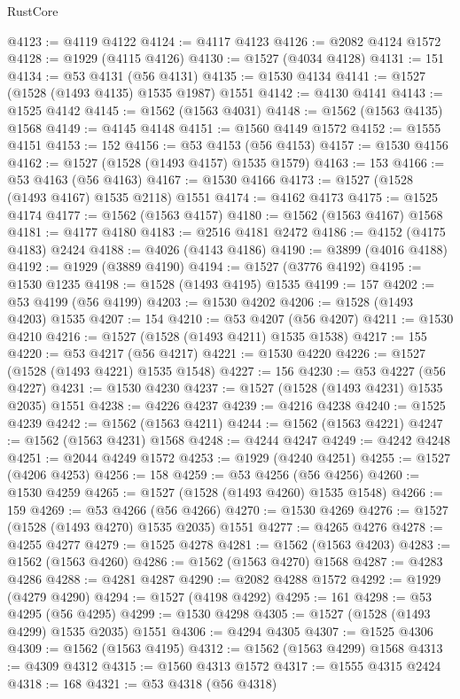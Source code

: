 \begin{lexlean}{RustCore}
\begin{coremodule}
@4123 := @4119 @4122
@4124 := @4117 @4123
@4126 := @2082 @4124 @1572
@4128 := @1929 (@4115 @4126)
@4130 := @1527 (@4034 @4128)
@4131 := 151
@4134 := @53 @4131 (@56 @4131)
@4135 := @1530 @4134
@4141 := @1527 (@1528 (@1493 @4135) @1535 @1987) @1551
@4142 := @4130 @4141
@4143 := @1525 @4142
@4145 := @1562 (@1563 @4031)
@4148 := @1562 (@1563 @4135) @1568
@4149 := @4145 @4148
@4151 := @1560 @4149 @1572
@4152 := @1555 @4151
@4153 := 152
@4156 := @53 @4153 (@56 @4153)
@4157 := @1530 @4156
@4162 := @1527 (@1528 (@1493 @4157) @1535 @1579)
@4163 := 153
@4166 := @53 @4163 (@56 @4163)
@4167 := @1530 @4166
@4173 := @1527 (@1528 (@1493 @4167) @1535 @2118) @1551
@4174 := @4162 @4173
@4175 := @1525 @4174
@4177 := @1562 (@1563 @4157)
@4180 := @1562 (@1563 @4167) @1568
@4181 := @4177 @4180
@4183 := @2516 @4181 @2472
@4186 := @4152 (@4175 @4183) @2424
@4188 := @4026 (@4143 @4186)
@4190 := @3899 (@4016 @4188)
@4192 := @1929 (@3889 @4190)
@4194 := @1527 (@3776 @4192)
@4195 := @1530 @1235
@4198 := @1528 (@1493 @4195) @1535
@4199 := 157
@4202 := @53 @4199 (@56 @4199)
@4203 := @1530 @4202
@4206 := @1528 (@1493 @4203) @1535
@4207 := 154
@4210 := @53 @4207 (@56 @4207)
@4211 := @1530 @4210
@4216 := @1527 (@1528 (@1493 @4211) @1535 @1538)
@4217 := 155
@4220 := @53 @4217 (@56 @4217)
@4221 := @1530 @4220
@4226 := @1527 (@1528 (@1493 @4221) @1535 @1548)
@4227 := 156
@4230 := @53 @4227 (@56 @4227)
@4231 := @1530 @4230
@4237 := @1527 (@1528 (@1493 @4231) @1535 @2035) @1551
@4238 := @4226 @4237
@4239 := @4216 @4238
@4240 := @1525 @4239
@4242 := @1562 (@1563 @4211)
@4244 := @1562 (@1563 @4221)
@4247 := @1562 (@1563 @4231) @1568
@4248 := @4244 @4247
@4249 := @4242 @4248
@4251 := @2044 @4249 @1572
@4253 := @1929 (@4240 @4251)
@4255 := @1527 (@4206 @4253)
@4256 := 158
@4259 := @53 @4256 (@56 @4256)
@4260 := @1530 @4259
@4265 := @1527 (@1528 (@1493 @4260) @1535 @1548)
@4266 := 159
@4269 := @53 @4266 (@56 @4266)
@4270 := @1530 @4269
@4276 := @1527 (@1528 (@1493 @4270) @1535 @2035) @1551
@4277 := @4265 @4276
@4278 := @4255 @4277
@4279 := @1525 @4278
@4281 := @1562 (@1563 @4203)
@4283 := @1562 (@1563 @4260)
@4286 := @1562 (@1563 @4270) @1568
@4287 := @4283 @4286
@4288 := @4281 @4287
@4290 := @2082 @4288 @1572
@4292 := @1929 (@4279 @4290)
@4294 := @1527 (@4198 @4292)
@4295 := 161
@4298 := @53 @4295 (@56 @4295)
@4299 := @1530 @4298
@4305 := @1527 (@1528 (@1493 @4299) @1535 @2035) @1551
@4306 := @4294 @4305
@4307 := @1525 @4306
@4309 := @1562 (@1563 @4195)
@4312 := @1562 (@1563 @4299) @1568
@4313 := @4309 @4312
@4315 := @1560 @4313 @1572
@4317 := @1555 @4315 @2424
@4318 := 168
@4321 := @53 @4318 (@56 @4318)

\end{coremodule}
\end{lexlean}
